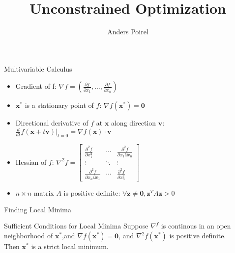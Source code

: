 \documentclass{beamer}
\title{Unconstrained Optimization}
\author{Anders Poirel}
\institute{University of California, Santa Cruz}
\begin{document}
    
\maketitle
    
    \begin{frame}{Multivariable Calculus}
        \begin{itemize}
            \item \alert{Gradient} of f: $\nabla f = \left( \frac{\partial f}{\partial x_1}, \ldots , \frac{\partial f}{\partial x_n} \right)$
            
            \item $\mathbf{x^*}$ is a \alert{stationary} point of $f$: $\nabla f(\mathbf{x^*}) = \mathbf{0}$
            
            \item \alert{Directional derivative} of $f$ at $\mathbf{x}$ along direction $\mathbf{v}$:
                $\frac{d}{dt}f(\mathbf{x} + t\mathbf{v})\Big\rvert_{t=0} = \nabla f(\mathbf{x}) \cdot \mathbf{v}$

            \item \alert{Hessian} of $f$: $\nabla^2 f = 
                \begin{bmatrix}
                    \frac{\partial^2 f}{\partial x_1^2} & \cdots & \frac{\partial^2 f}{\partial x_1 \partial x_n} \\
                    \vdots & \ddots & \vdots \\
                    \frac{\partial^2 f}{\partial x_n \partial x_1} & \cdots & \frac{\partial^2 f}{\partial x_n^2}
                \end{bmatrix}$

            \item $n \times n$ matrix $A$ is \alert{positive definite}: $\forall \mathbf{z} \neq \mathbf{0}, \mathbf{z}^TA\mathbf{z} > 0$
        \end{itemize}
    \end{frame}

    \begin{frame}{Finding Local Minima}
        \begin{block}{Sufficient Conditions for Local Minima} Suppose $\nabla ^f$ is continous in an \alert{open neighborhood} of $\mathbf{x^*}$,and $\nabla f(\mathbf{x^*}) = \mathbf{0}$, and $\nabla^2 f(\mathbf{x^*})$ is \alert{positive definite}. \\
        Then $\mathbf{x^*}$ is a strict local minimum.
        \end{block}

    \end{frame}
\end{document}

